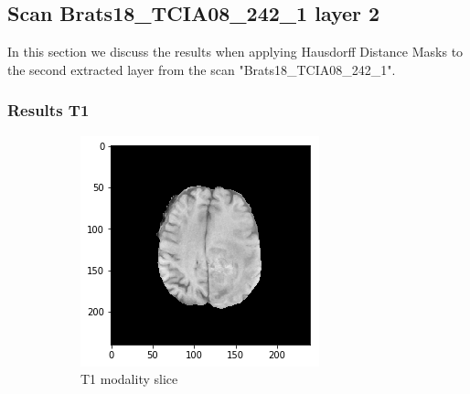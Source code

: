 \subsection{Scan Brats18\_TCIA08\_242\_1 layer 2}
In this section we discuss the results when applying Hausdorff Distance Masks to the second extracted layer from the scan "Brats18\_TCIA08\_242\_1".


\subsubsection{Results T1}

\begin{figure}[H]
    \centering
    \begin{subfigure}[t]{.4\textwidth}
        \centering
        \includegraphics[width=\linewidth]{chapters/06_hdm/b_Brats18_TCIA08_242_1_L2/21.png}
        \caption{T1 modality slice}
    \end{subfigure}\hspace{1cm}%
    \begin{subfigure}[t]{.4\textwidth}
        \centering

\end{subfigure}
\end{figure}
